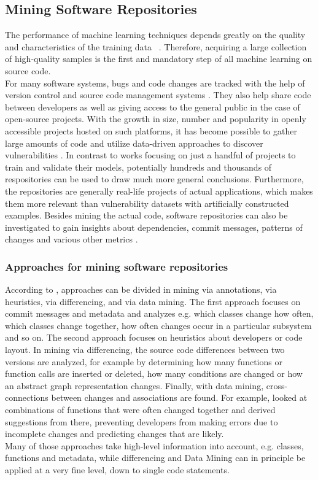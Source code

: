 \documentclass[
	a4paper,
	pagesize,
	pdftex,
	12pt,
	twoside, %
	BCOR=5mm, %
	ngerman,
	fleqn,
	final,
	]{scrartcl}
\begin{document}
\subsection{Mining Software Repositories}\label{Mining-Software-Repositories}
The performance of machine learning techniques depends greatly on the quality and characteristics of the training data ~\cite{Pang.2015}. Therefore, acquiring a large collection of high-quality samples is the first and mandatory step of all machine learning on source code.\\
For many software systems, bugs and code changes are tracked with the help of version control and source code management systems \cite{Zhou.2017}. They also help share code between developers as well as giving access to the general public in the case of open-source projects. With the growth in size, number and popularity in openly accessible projects hosted on such platforms, it has become possible to gather large amounts of code and utilize data-driven approaches to discover vulnerabilities \cite{Russell.2018}. In contrast to works focusing on just a handful of projects to train and validate their models, potentially hundreds and thousands of respositories can be used to draw much more general conclusions. Furthermore, the repositories are generally real-life projects of actual applications, which makes them more relevant than vulnerability datasets with artificially constructed examples. Besides mining the actual code, software repositories can also be investigated to gain insights about dependencies, commit messages, patterns of changes and various other metrics \citep{Liu.2018}.\\
\subsubsection{Approaches for mining software repositories}
According to \cite{Kagdi.2005}, approaches can be divided in mining via annotations, via heuristics, via differencing, and via data mining. The first approach focuses on commit messages and metadata and analyzes e.g. which classes change how often, which classes change together, how often changes occur in a particular subsystem and so on. The second approach focuses on heuristics about developers or code layout. In mining via differencing, the source code differences between two versions are analyzed, for example by determining how many functions or function calls are inserted or deleted, how many conditions are changed or how an abstract graph representation changes. Finally, with data mining, cross-connections between changes and associations are found. For example, \cite{Zimmermann.2005} looked at combinations of functions that were often changed together and derived suggestions from there, preventing developers from making errors due to incomplete changes and predicting changes that are likely.\\
Many of those approaches take high-level information into account, e.g. classes, functions and metadata, while differencing and Data Mining can in principle be applied at a very fine level, down to single code statements.
\end{document}
